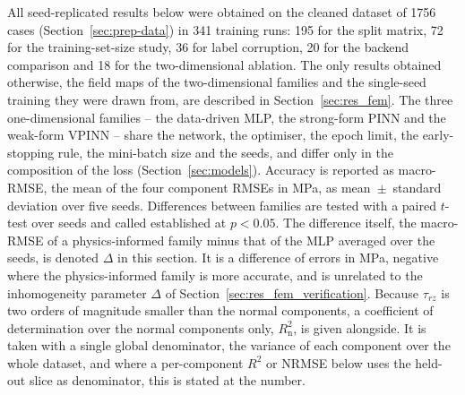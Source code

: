 All seed-replicated results below were obtained on the cleaned dataset of 1756 cases (Section~\ref{sec:prep-data}) in 341 training runs: 195 for the split matrix, 72 for the training-set-size study, 36 for label corruption, 20 for the backend comparison and 18 for the two-dimensional ablation. The only results obtained otherwise, the field maps of the two-dimensional families and the single-seed training they were drawn from, are described in Section~\ref{sec:res_fem}. %
The three one-dimensional families -- the data-driven MLP, the strong-form PINN and the weak-form VPINN -- share the network, the optimiser, the epoch limit, the early-stopping rule, the mini-batch size and the seeds, and differ only in the composition of the loss (Section~\ref{sec:models}). Accuracy is reported as macro-RMSE, the mean of the four component RMSEs in MPa, as mean~$\pm$~standard deviation over five seeds. Differences between families are tested with a paired $t$-test over seeds \citep{demsar2006} and called established at $p<0.05$. The difference itself, the macro-RMSE of a physics-informed family minus that of the MLP averaged over the seeds, is denoted $\Delta$ in this section. It is a difference of errors in MPa, negative where the physics-informed family is more accurate, and is unrelated to the inhomogeneity parameter $\Delta$ of Section~\ref{sec:res_fem_verification}. Because $\tau_{rz}$ is two orders of magnitude smaller than the normal components, a coefficient of determination over the normal components only, $R^2_{\mathrm{n}}$, is given alongside. It is taken with a single global denominator, the variance of each component over the whole dataset, and where a per-component $R^2$ or NRMSE below uses the held-out slice as denominator, this is stated at the number. %
